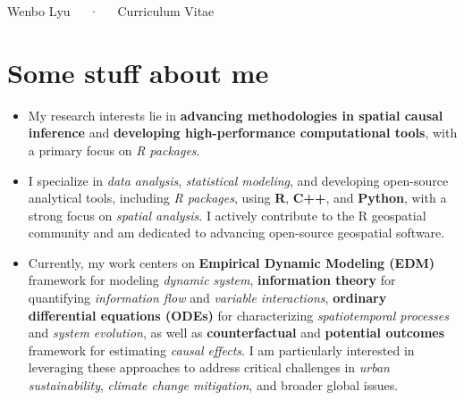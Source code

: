 \documentclass[11pt,a4paper,]{awesome-cv}
\providecommand{\tightlist}{%
	\setlength{\itemsep}{0pt}\setlength{\parskip}{0pt}}
\begin{document}
\makecvheader

\makecvfooter
  {}
    {Wenbo Lyu~~~·~~~Curriculum Vitae}
  {\thepage}





\section{Some stuff about me}\label{some-stuff-about-me}

\begin{itemize}
\tightlist
\item
  My research interests lie in \textbf{advancing methodologies in
  spatial causal inference} and \textbf{developing high-performance
  computational tools}, with a primary focus on \emph{R packages}.
\item
  I specialize in \emph{data analysis}, \emph{statistical modeling}, and
  developing open-source analytical tools, including \emph{R packages},
  using \textbf{R}, \textbf{C++}, and \textbf{Python}, with a strong
  focus on \emph{spatial analysis}. I actively contribute to the R
  geospatial community and am dedicated to advancing open-source
  geospatial software.
\item
  Currently, my work centers on \textbf{Empirical Dynamic Modeling
  (EDM)} framework for modeling \emph{dynamic system},
  \textbf{information theory} for quantifying \emph{information flow}
  and \emph{variable interactions}, \textbf{ordinary differential
  equations (ODEs)} for characterizing \emph{spatiotemporal processes}
  and \emph{system evolution}, as well as \textbf{counterfactual} and
  \textbf{potential outcomes} framework for estimating \emph{causal
  effects}. I am particularly interested in leveraging these approaches
  to address critical challenges in \emph{urban sustainability},
  \emph{climate change mitigation}, and broader global issues.
\end{itemize}
\end{document}
